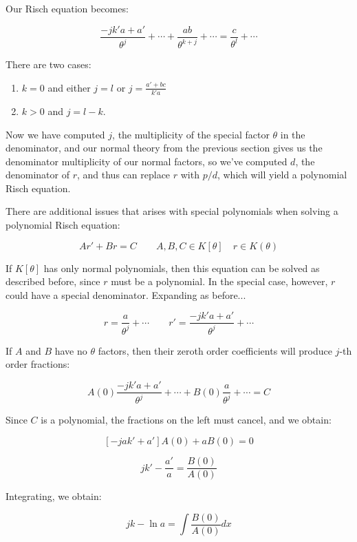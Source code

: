 Our Risch equation becomes:

$$\frac{-j k' a + a'}{\theta^{j}} + \cdots + \frac{a b }{\theta^{k+j}} + \cdots
= \frac{c}{\theta^l} + \cdots$$

There are two cases:

\begin{enumerate}
\item $k=0$ and either $j=l$ or
$j = \frac{a' + b c}{k' a}$
\item $k>0$ and $j=l-k$.
\end{enumerate}

Now we have computed $j$, the multiplicity of the special factor
$\theta$ in the
denominator, and our normal theory from the previous section gives us
the denominator multiplicity of our normal factors, so
we've computed $d$, the denominator of $r$, and
thus can replace $r$ with $p/d$, which will
yield a polynomial Risch equation.

There are additional issues that arises with special polynomials when
solving a polynomial Risch equation:

$$A r' + B r = C \qquad A,B,C \in K[\theta] \quad r \in K(\theta)$$

If $K[\theta]$ has only normal polynomials, then this equation can be
solved as described before, since $r$ must be a polynomial.
In the special case, however, $r$ could have a special denominator.
Expanding as before...

$$r = \frac{a}{\theta^j} + \cdots  \qquad  r' = \frac{-j k' a + a'}{\theta^{j}} + \cdots$$

If $A$ and $B$ have no $\theta$ factors, then their zeroth order coefficients will produce $j$-th order fractions:

$$ A(0) \frac{-j k' a + a'}{\theta^{j}} + \cdots
+ B(0) \frac{a}{\theta^j} + \cdots  = C$$

Since $C$ is a polynomial, the fractions on the left must cancel, and we obtain:

$$\left[ -j a k' + a' \right] A(0) + a B(0) = 0$$


$$ jk' - \frac{a'}{a }  = \frac{B(0)}{A(0)}$$

Integrating, we obtain:

$$ jk - \ln a = \int \frac{B(0)}{A(0)} dx$$

